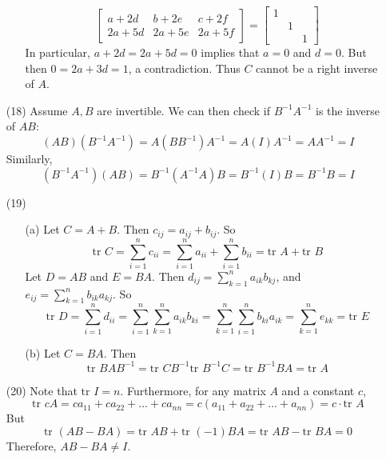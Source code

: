 \documentclass[12pt]{article}
\begin{document}
\begin{itemize}
\begin{itemize}
$$\begin{bmatrix}
a + 2d & b + 2e & c + 2f \\
2a + 5d & 2a + 5e & 2a + 5f
\end{bmatrix} = \begin{bmatrix}
1 & & \\
& 1 & \\
& & 1
\end{bmatrix} $$
In particular, $a + 2d = 2a + 5d = 0$ implies that $a = 0$ and $d = 0$. But then $0 = 2a + 3d = 1$, a contradiction. Thus $C$ cannot be a right inverse of $A$.
\end{itemize}
\item[(18)]
Assume $A, B$ are invertible. We can then check if $B^{-1}A^{-1}$ is the inverse of $AB$:
$$(AB)(B^{-1}A^{-1}) = A(BB^{-1})A^{-1} = A(I)A^{-1} = AA^{-1} = I$$
Similarly,
$$(B^{-1}A^{-1})(AB) = B^{-1}(A^{-1}A)B = B^{-1}(I)B = B^{-1}B = I$$
\item[(19)]
\begin{itemize}
\item[(a)]
Let $C = A + B$. Then $c_{ij} = a_{ij} + b_{ij}$. So
$$\text{tr }C = \sum_{i=1}^n c_{ii} = \sum_{i=1}^n a_{ii} + \sum_{i=1}^n b_{ii} = \text{tr }A + \text{tr }B$$
Let $D = AB$ and $E = BA$. Then $d_{ij} = \sum_{k=1}^n a_{ik}b_{kj}$, and $e_{ij} = \sum_{k=1}^n b_{ik}a_{kj}$. So
$$\text{tr }D = \sum_{i = 1}^n d_{ii} = \sum_{i=1}^n\sum_{k=1}^n a_{ik}b_{ki} = \sum_{k=1}^n\sum_{i=1}^n b_{ki}a_{ik} = \sum_{k=1}^n e_{kk} = \text{tr }E$$
\item[(b)]
Let $C = BA$. Then
$$\text{tr }BAB^{-1} = \text{tr }CB^{-1} \text{tr }B^{-1}C = \text{tr }B^{-1}BA = \text{tr }A$$
\end{itemize}
\item[(20)]
Note that $\text{tr }I = n$. Furthermore, for any matrix $A$ and a constant $c$, 
$$\text{tr }cA = ca_{11} + ca_{22} + ... + ca_{nn} = c(a_{11} + a_{22} + ... + a_{nn}) = c \cdot \text{tr }A$$ 
But
$$\text{tr }(AB - BA) = \text{tr }AB + \text{tr }(-1)BA = \text{tr }AB - \text{tr }BA = 0$$
Therefore, $AB - BA \neq I$.
\end{itemize}
\end{document}

